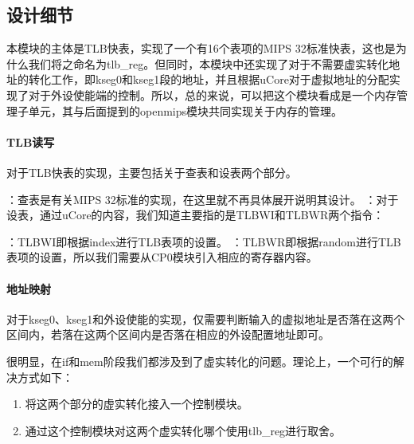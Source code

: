     \subsection{设计细节}
    本模块的主体是TLB快表，实现了一个有16个表项的MIPS 32标准快表，这也是为什么我们将之命名为tlb\_reg。但同时，本模块中还实现了对于不需要虚实转化地址的转化工作，即kseg0和kseg1段的地址，并且根据uCore对于虚拟地址的分配实现了对于外设使能端的控制。所以，总的来说，可以把这个模块看成是一个内存管理子单元，其与后面提到的openmips模块共同实现关于内存的管理。

        \paragraph{TLB读写}
        对于TLB快表的实现，主要包括关于查表和设表两个部分。
        \begin{enumerate}
            ：查表是有关MIPS 32标准的实现，在这里就不再具体展开说明其设计。
            ：对于设表，通过uCore的内容，我们知道主要指的是TLBWI和TLBWR两个指令：
            \begin{enumerate}
                ：TLBWI即根据index进行TLB表项的设置。
                ：TLBWR即根据random进行TLB表项的设置，所以我们需要从CP0模块引入相应的寄存器内容。
            \end{enumerate}
        \end{enumerate}

        \paragraph{地址映射}
        对于kseg0、kseg1和外设使能的实现，仅需要判断输入的虚拟地址是否落在这两个区间内，若落在这两个区间内是否落在相应的外设配置地址即可。

        很明显，在if和mem阶段我们都涉及到了虚实转化的问题。理论上，一个可行的解决方式如下：
        \begin{enumerate}
            \item 将这两个部分的虚实转化接入一个控制模块。
            \item 通过这个控制模块对这两个虚实转化哪个使用tlb\_reg进行取舍。
        \end{enumerate}

